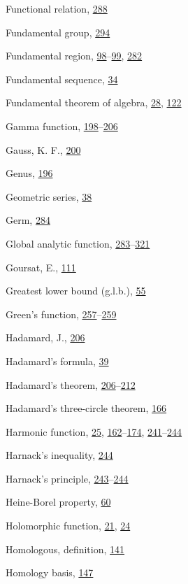\begin{theindex}
\item Functional relation, \hyperlink{orig-p288}{288}
\item Fundamental group, \hyperlink{orig-p294}{294}
\item Fundamental region, \hyperlink{orig-p98}{98}--\hyperlink{orig-p99}{99}, \hyperlink{orig-p282}{282}
\item Fundamental sequence, \hyperlink{orig-p34}{34}
\item Fundamental theorem of algebra, \hyperlink{orig-p28}{28}, \hyperlink{orig-p122}{122}
\item Gamma function, \hyperlink{orig-p198}{198}--\hyperlink{orig-p206}{206}
\item Gauss, K. F., \hyperlink{orig-p200}{200}
\item Genus, \hyperlink{orig-p196}{196}
\item Geometric series, \hyperlink{orig-p38}{38}
\item Germ, \hyperlink{orig-p284}{284}
\item Global analytic function, \hyperlink{orig-p283}{283}--\hyperlink{orig-p321}{321}
\item Goursat, E., \hyperlink{orig-p111}{111}
\item Greatest lower bound (g.l.b.), \hyperlink{orig-p55}{55}
\item Green's function, \hyperlink{orig-p257}{257}--\hyperlink{orig-p259}{259}
\item Hadamard, J., \hyperlink{orig-p206}{206}
\item Hadamard's formula, \hyperlink{orig-p39}{39}
\item Hadamard's theorem, \hyperlink{orig-p206}{206}--\hyperlink{orig-p212}{212}
\item Hadamard's three-circle theorem, \hyperlink{orig-p166}{166}
\item Harmonic function, \hyperlink{orig-p25}{25}, \hyperlink{orig-p162}{162}--\hyperlink{orig-p174}{174}, \hyperlink{orig-p241}{241}--\hyperlink{orig-p244}{244}
\item Harnack's inequality, \hyperlink{orig-p244}{244}
\item Harnack's principle, \hyperlink{orig-p243}{243}--\hyperlink{orig-p244}{244}
\item Heine-Borel property, \hyperlink{orig-p60}{60}
\item Holomorphic function, \hyperlink{orig-p21}{21}, \hyperlink{orig-p24}{24}
\item Homologous, definition, \hyperlink{orig-p141}{141}
\item Homology basis, \hyperlink{orig-p147}{147}

\end{theindex}
